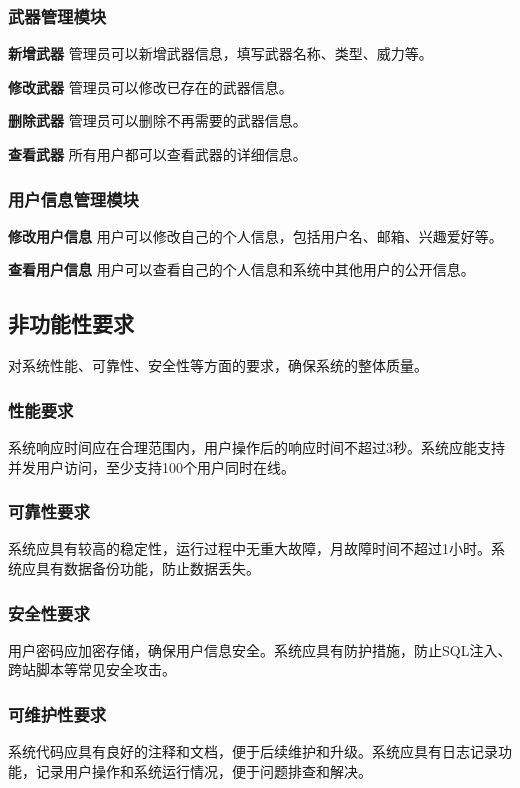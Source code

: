 \documentclass{base}
\begin{document}
\subsubsection{武器管理模块}
\textbf{新增武器} 管理员可以新增武器信息，填写武器名称、类型、威力等。

\textbf{修改武器} 管理员可以修改已存在的武器信息。

\textbf{删除武器} 管理员可以删除不再需要的武器信息。

\textbf{查看武器} 所有用户都可以查看武器的详细信息。

\subsubsection{用户信息管理模块}

\textbf{修改用户信息} 用户可以修改自己的个人信息，包括用户名、邮箱、兴趣爱好等。

\textbf{查看用户信息} 用户可以查看自己的个人信息和系统中其他用户的公开信息。

\subsection{非功能性要求}

对系统性能、可靠性、安全性等方面的要求，确保系统的整体质量。

\subsubsection{性能要求}
系统响应时间应在合理范围内，用户操作后的响应时间不超过3秒。系统应能支持并发用户访问，至少支持100个用户同时在线。

\subsubsection{可靠性要求}

系统应具有较高的稳定性，运行过程中无重大故障，月故障时间不超过1小时。系统应具有数据备份功能，防止数据丢失。

\subsubsection{安全性要求}
用户密码应加密存储，确保用户信息安全。系统应具有防护措施，防止SQL注入、跨站脚本等常见安全攻击。

\subsubsection{可维护性要求}
系统代码应具有良好的注释和文档，便于后续维护和升级。系统应具有日志记录功能，记录用户操作和系统运行情况，便于问题排查和解决。
\end{document}
